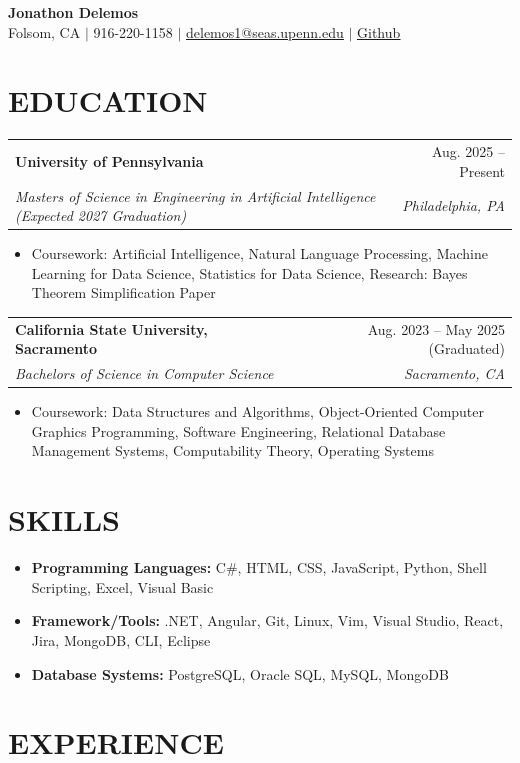 \documentclass[10pt,letterpaper]{article}
\makeatletter
\newcommand{\resumeItem}[1]{\item {#1}}
\newcommand{\resumeSubheading}[4]{
  \begin{tabularx}{\textwidth}{@{}X r@{}}
    \textbf{#1} & #2 \\
    \textit{#3} & \textit{#4} \\
  \end{tabularx}
}
\makeatother
\begin{document}
\begin{center}
    {\LARGE \textbf{Jonathon Delemos}} \\
    \vspace{4pt}
    Folsom, CA $\vert$ 916-220-1158 $\vert$ \underline{\href{mailto:delemos1@seas.upenn.edu}{delemos1@seas.upenn.edu}} $\vert$  \underline{\href{https://github.com/jdelemos}{Github}}
\end{center}

\section*{EDUCATION}

\resumeSubheading
{University of Pennsylvania}{Aug. 2025 -- Present}
{Masters of Science in Engineering in Artificial Intelligence (Expected 2027 Graduation)}{Philadelphia, PA}
\begin{itemize}
    \resumeItem{Coursework: Artificial Intelligence, Natural Language Processing, Machine Learning for Data Science, Statistics for Data Science, Research: Bayes Theorem Simplification Paper}
\end{itemize}

\resumeSubheading
{California State University, Sacramento}{Aug. 2023 -- May 2025 (Graduated)}
{Bachelors of Science in Computer Science}{Sacramento, CA}
\begin{itemize}
    \resumeItem{Coursework: Data Structures and Algorithms, Object-Oriented Computer Graphics Programming,
        Software Engineering, Relational Database Management Systems, Computability Theory, Operating Systems}
\end{itemize}

\section*{SKILLS}
\begin{itemize}
    \item \textbf{Programming Languages:} C\#, HTML, CSS, JavaScript, Python, Shell Scripting, Excel, Visual Basic
    \item \textbf{Framework/Tools:} .NET, Angular, Git, Linux, Vim, Visual Studio, React, Jira, MongoDB, CLI, Eclipse
    \item \textbf{Database Systems:} PostgreSQL, Oracle SQL, MySQL, MongoDB
\end{itemize}

\section*{EXPERIENCE}
\end{document}
